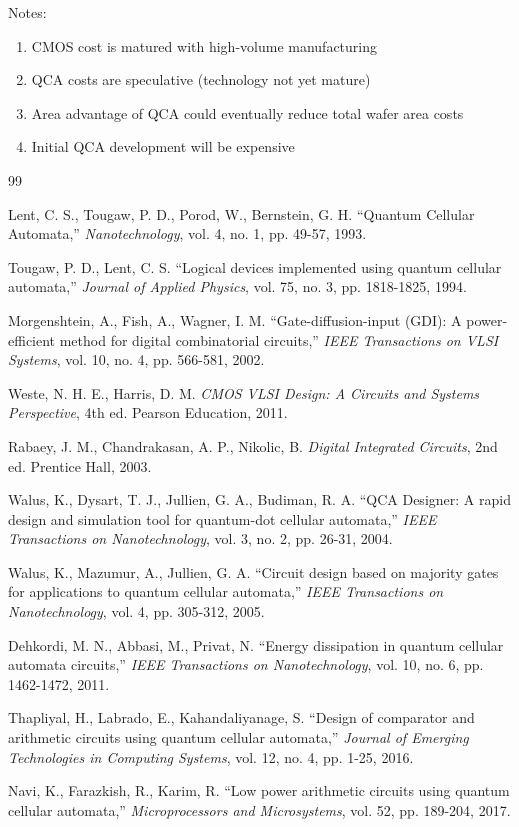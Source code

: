 \documentclass[12pt,a4paper,twoside]{report}
\begin{document}
\begin{appendices}
Notes:
\begin{enumerate}
    \item CMOS cost is matured with high-volume manufacturing
    \item QCA costs are speculative (technology not yet mature)
    \item Area advantage of QCA could eventually reduce total wafer area costs
    \item Initial QCA development will be expensive
\end{enumerate}

\end{appendices}

\begin{thebibliography}{99}

 Lent, C. S., Tougaw, P. D., Porod, W., Bernstein, G. H. ``Quantum Cellular Automata,'' \textit{Nanotechnology}, vol. 4, no. 1, pp. 49-57, 1993.

 Tougaw, P. D., Lent, C. S. ``Logical devices implemented using quantum cellular automata,'' \textit{Journal of Applied Physics}, vol. 75, no. 3, pp. 1818-1825, 1994.

 Morgenshtein, A., Fish, A., Wagner, I. M. ``Gate-diffusion-input (GDI): A power-efficient method for digital combinatorial circuits,'' \textit{IEEE Transactions on VLSI Systems}, vol. 10, no. 4, pp. 566-581, 2002.

 Weste, N. H. E., Harris, D. M. \textit{CMOS VLSI Design: A Circuits and Systems Perspective}, 4th ed. Pearson Education, 2011.

 Rabaey, J. M., Chandrakasan, A. P., Nikolic, B. \textit{Digital Integrated Circuits}, 2nd ed. Prentice Hall, 2003.

 Walus, K., Dysart, T. J., Jullien, G. A., Budiman, R. A. ``QCA Designer: A rapid design and simulation tool for quantum-dot cellular automata,'' \textit{IEEE Transactions on Nanotechnology}, vol. 3, no. 2, pp. 26-31, 2004.

 Walus, K., Mazumur, A., Jullien, G. A. ``Circuit design based on majority gates for applications to quantum cellular automata,'' \textit{IEEE Transactions on Nanotechnology}, vol. 4, pp. 305-312, 2005.

 Dehkordi, M. N., Abbasi, M., Privat, N. ``Energy dissipation in quantum cellular automata circuits,'' \textit{IEEE Transactions on Nanotechnology}, vol. 10, no. 6, pp. 1462-1472, 2011.

 Thapliyal, H., Labrado, E., Kahandaliyanage, S. ``Design of comparator and arithmetic circuits using quantum cellular automata,'' \textit{Journal of Emerging Technologies in Computing Systems}, vol. 12, no. 4, pp. 1-25, 2016.

 Navi, K., Farazkish, R., Karim, R. ``Low power arithmetic circuits using quantum cellular automata,'' \textit{Microprocessors and Microsystems}, vol. 52, pp. 189-204, 2017.

\end{thebibliography}

\end{document}
